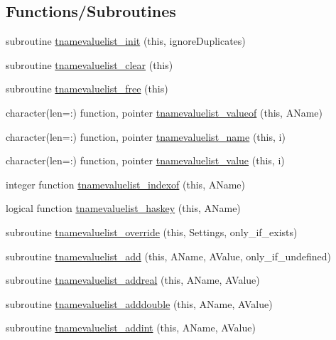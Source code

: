 \subsection*{Functions/\+Subroutines}
\begin{DoxyCompactItemize}
\item 
subroutine \mbox{\hyperlink{namespaceiniobjects_aaa5d8364fae58e251714849bb64e5124}{tnamevaluelist\+\_\+init}} (this, ignore\+Duplicates)
\item 
subroutine \mbox{\hyperlink{namespaceiniobjects_a5f3c26a113f5171e6bdf68705ced9854}{tnamevaluelist\+\_\+clear}} (this)
\item 
subroutine \mbox{\hyperlink{namespaceiniobjects_aaa465cf37dfe148879b8073a289ab2f8}{tnamevaluelist\+\_\+free}} (this)
\item 
character(len=\+:) function, pointer \mbox{\hyperlink{namespaceiniobjects_a885480cca0257f187dfcd491a588ce52}{tnamevaluelist\+\_\+valueof}} (this, A\+Name)
\item 
character(len=\+:) function, pointer \mbox{\hyperlink{namespaceiniobjects_a4f92f7df639bb521266ea3f6be8dbc47}{tnamevaluelist\+\_\+name}} (this, i)
\item 
character(len=\+:) function, pointer \mbox{\hyperlink{namespaceiniobjects_a61f8d01755e0bc000c0c8ca3eba8e43a}{tnamevaluelist\+\_\+value}} (this, i)
\item 
integer function \mbox{\hyperlink{namespaceiniobjects_af6bb8b086a07d911f23b9d408dd89a2e}{tnamevaluelist\+\_\+indexof}} (this, A\+Name)
\item 
logical function \mbox{\hyperlink{namespaceiniobjects_ae95e15db4e04c8026f9193252ebe48e6}{tnamevaluelist\+\_\+haskey}} (this, A\+Name)
\item 
subroutine \mbox{\hyperlink{namespaceiniobjects_a96ec4d817cb41567afeefde7d8c0c7ec}{tnamevaluelist\+\_\+override}} (this, Settings, only\+\_\+if\+\_\+exists)
\item 
subroutine \mbox{\hyperlink{namespaceiniobjects_a0bf091b688bae891c20047d3b5bfca2a}{tnamevaluelist\+\_\+add}} (this, A\+Name, A\+Value, only\+\_\+if\+\_\+undefined)
\item 
subroutine \mbox{\hyperlink{namespaceiniobjects_a4ede9664ab0d5e4d00d1983e70c64322}{tnamevaluelist\+\_\+addreal}} (this, A\+Name, A\+Value)
\item 
subroutine \mbox{\hyperlink{namespaceiniobjects_a8214934f23a7801b7ec3c3f6da452aac}{tnamevaluelist\+\_\+adddouble}} (this, A\+Name, A\+Value)
\item 
subroutine \mbox{\hyperlink{namespaceiniobjects_a4c60c5afba93a368d2e832c9adbf6964}{tnamevaluelist\+\_\+addint}} (this, A\+Name, A\+Value)

\end{DoxyCompactItemize}
